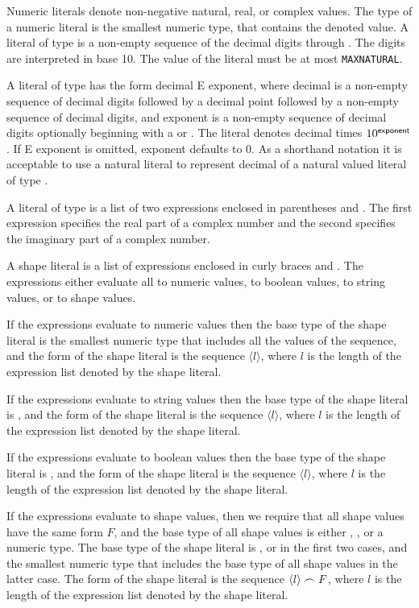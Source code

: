 Numeric literals denote non-negative natural, real, or complex
values. The type of a numeric literal is the smallest numeric type,
that contains the denoted value. A literal of type  is a
non-empty sequence of the decimal digits {} through {}. The
digits are interpreted in base 10. The value of the literal must be at
most \texttt{MAXNATURAL}.

A literal of type  has the form {\sf decimal E exponent},
where {\sf decimal} is a non-empty sequence of decimal digits followed
by a decimal point followed by a non-empty sequence of decimal digits,
and {\sf exponent} is a non-empty sequence of decimal digits
optionally beginning with a \T{+} or \T{-}. The literal denotes
decimal times $10^{\sf exponent}$. If {\sf E exponent} is omitted,
{\sf exponent} defaults to 0. As a shorthand notation it is acceptable
to use a natural literal to represent {\sf decimal} of a natural
valued literal of type .

A literal of type  is a list of two expressions enclosed in
parentheses \T{(} and \T{)}. The first expression specifies the real
part of a complex number and the second specifies the imaginary part
of a complex number.

A shape literal is a list of expressions enclosed in curly braces
\T{\{} and \T{\}}. The expressions either evaluate all to numeric
values, to boolean values, to string values, or to shape values. 

If the expressions evaluate to numeric values then the base type of
the shape literal is the smallest numeric type that includes all the
values of the sequence, and the form of the shape literal is the
sequence $\langle l \rangle$, where $l$ is the length of the
expression list denoted by the shape literal.

If the expressions evaluate to string values then the base type of the
shape literal is , and the form of the shape literal is the
sequence $\langle l \rangle$, where $l$ is the length of the
expression list denoted by the shape literal.

If the expressions evaluate to boolean values then the base type of
the shape literal is , and the form of the shape literal is
the sequence $\langle l \rangle$, where $l$ is the length of the
expression list denoted by the shape literal.

If the expressions evaluate to shape values, then we require that all
shape values have the same form $F$, and the base type of all shape
values is either , , or a numeric type. The base
type of the shape literal is , or  in the first
two cases, and the smallest numeric type that includes the base type
of all shape values in the latter case. The form of the shape literal
is the sequence $\langle l \rangle \frown F$, where $l$ is the length
of the expression list denoted by the shape literal.


